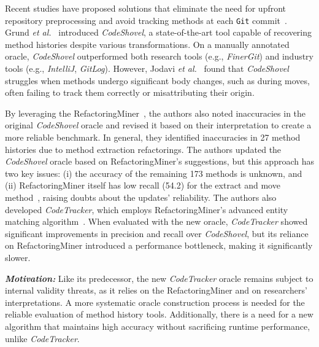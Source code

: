 Recent studies have proposed solutions that eliminate the need for upfront repository preprocessing and avoid tracking methods at each \texttt{Git} commit~\cite{jodavi_accurate_2022, grund_codeshovel_2021}. Grund \textit{et al.}~\cite{grund_codeshovel_2021} introduced \textit{CodeShovel}, a state-of-the-art tool capable of recovering method histories despite various transformations. On a manually annotated oracle, \textit{CodeShovel} outperformed both research tools (e.g., \textit{FinerGit}) and industry tools (e.g., \textit{IntelliJ}, \textit{GitLog}). However, Jodavi \textit{et al.}~\cite{jodavi_accurate_2022} found that \textit{CodeShovel} struggles when methods undergo significant body changes, such as during moves, often failing to track them correctly or misattributing their origin.

By leveraging the RefactoringMiner~\cite{tsantalis_refactoringminer_2022}, the authors also noted inaccuracies in the original \textit{CodeShovel} oracle and revised it based on their interpretation to create a more reliable benchmark. In general, they identified inaccuracies in 27 method histories due to method extraction refactorings. The authors updated the \textit{CodeShovel} oracle based on RefactoringMiner’s suggestions, but this approach has two key issues: (i) the accuracy of the remaining 173 methods is unknown, and (ii) RefactoringMiner itself has low recall (54.2) for the extract and move method~\cite{tsantalis_refactoringminer_2022}, raising doubts about the updates’ reliability. The authors also developed \textit{CodeTracker}, which employs RefactoringMiner’s advanced entity matching algorithm~\cite{tsantalis_refactoringminer_2022}. When evaluated with the new oracle, \textit{CodeTracker} showed significant improvements in precision and recall over \textit{CodeShovel}, but its reliance on RefactoringMiner introduced a performance bottleneck, making it significantly slower.

\emph{\textbf{Motivation:}} Like its predecessor, the new \textit{CodeTracker} oracle remains subject to internal validity threats, as it relies on the RefactoringMiner and on researchers’ interpretations. A more systematic oracle construction process is needed for the reliable evaluation of method history tools. Additionally, there is a need for a new algorithm that maintains high accuracy without sacrificing runtime performance, unlike \textit{CodeTracker}.
